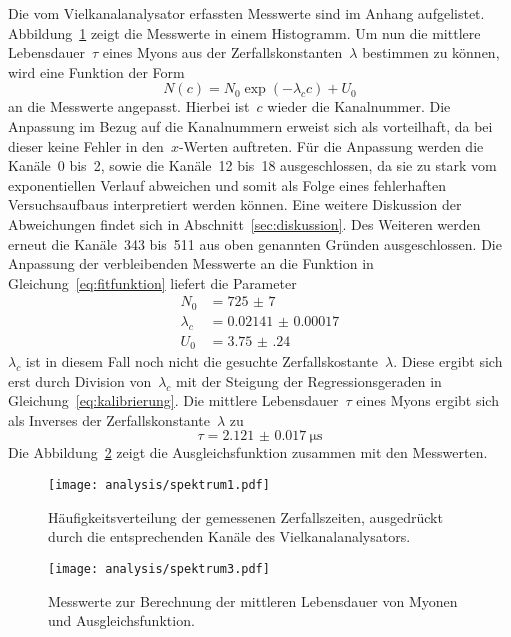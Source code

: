 Die vom Vielkanalanalysator erfassten Messwerte sind im Anhang aufgelistet.
Abbildung~\ref{fig:spektrum1} zeigt die Messwerte in einem Histogramm. Um nun
die mittlere Lebensdauer~$\tau$ eines Myons aus der Zerfallskonstanten~$\lambda$
bestimmen zu können, wird eine Funktion der Form
%
\begin{equation}
  N(c)=N_0\exp\left(-\lambda_cc\right)+U_0
  \label{eq:fitfunktion}
\end{equation}
%
an die Messwerte angepasst. Hierbei ist~$c$ wieder die Kanalnummer. Die
Anpassung im Bezug auf die Kanalnummern erweist sich als vorteilhaft, da bei
dieser keine Fehler in den~$x$-Werten auftreten. Für die Anpassung werden die
Kanäle~\num{0} bis~\num{2}, sowie die Kanäle~\num{12} bis~\num{18}
ausgeschlossen, da sie zu stark vom exponentiellen Verlauf abweichen und somit
als Folge eines fehlerhaften Versuchsaufbaus interpretiert werden können. Eine
weitere Diskussion der Abweichungen findet sich in
Abschnitt~\ref{sec:diskussion}. Des Weiteren werden erneut die Kanäle~\num{343}
bis~\num{511} aus oben genannten Gründen ausgeschlossen. Die Anpassung der
verbleibenden Messwerte an die Funktion in Gleichung~\ref{eq:fitfunktion}
liefert die Parameter
%
\begin{align}
  N_0&=\num{725(7)} \\
  \lambda_c&=\num{0.02141(17)} \\
  U_0&=\num{3.75(24)}
  \label{eq:fitparameter}
\end{align}
%
$\lambda_c$ ist in diesem Fall noch nicht die gesuchte
Zerfallskostante~$\lambda$. Diese ergibt sich erst durch Division
von~$\lambda_c$ mit der Steigung der Regressionsgeraden in
Gleichung~\ref{eq:kalibrierung}. Die mittlere Lebensdauer~$\tau$ eines Myons
ergibt sich als Inverses der Zerfallskonstante~$\lambda$ zu
%
\begin{equation}
  \tau=\SI{2.121(17)}{\micro\second}
  \label{eq:ergebnis}
\end{equation}
%
Die Abbildung~\ref{fig:spektrum3} zeigt die Ausgleichsfunktion zusammen mit den
Messwerten.

\begin{figure}[htb]
  \centering
  \texttt{[image: analysis/spektrum1.pdf]}
  \caption{Häufigkeitsverteilung der gemessenen Zerfallszeiten, ausgedrückt
  durch die entsprechenden Kanäle des Vielkanalanalysators.}
  \label{fig:spektrum1}
\end{figure}

\begin{figure}[htb]
  \centering
  \texttt{[image: analysis/spektrum3.pdf]}
  \caption{Messwerte zur Berechnung der mittleren Lebensdauer von Myonen und
  Ausgleichsfunktion.}
  \label{fig:spektrum3}
\end{figure}
